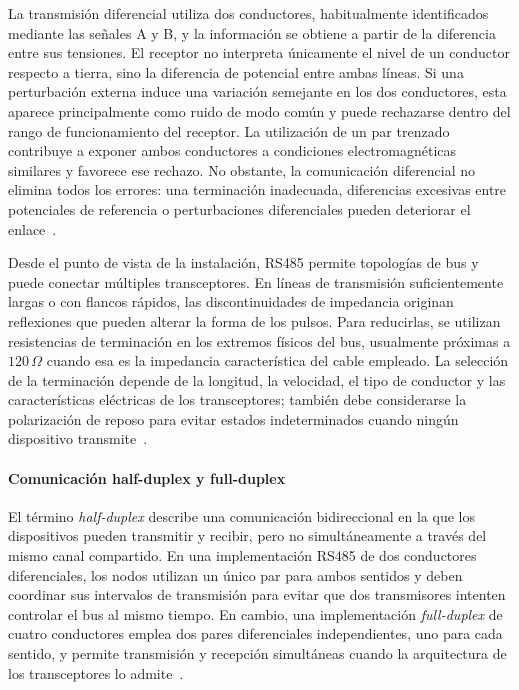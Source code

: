 La transmisión diferencial utiliza dos conductores, habitualmente identificados mediante las señales A y B, y la información se obtiene a partir de la diferencia entre sus tensiones. El receptor no interpreta únicamente el nivel de un conductor respecto a tierra, sino la diferencia de potencial entre ambas líneas. Si una perturbación externa induce una variación semejante en los dos conductores, esta aparece principalmente como ruido de modo común y puede rechazarse dentro del rango de funcionamiento del receptor. La utilización de un par trenzado contribuye a exponer ambos conductores a condiciones electromagnéticas similares y favorece ese rechazo. No obstante, la comunicación diferencial no elimina todos los errores: una terminación inadecuada, diferencias excesivas entre potenciales de referencia o perturbaciones diferenciales pueden deteriorar el enlace~\cite{kugelstadt2021rs485}.

Desde el punto de vista de la instalación, RS485 permite topologías de bus y puede conectar múltiples transceptores. En líneas de transmisión suficientemente largas o con flancos rápidos, las discontinuidades de impedancia originan reflexiones que pueden alterar la forma de los pulsos. Para reducirlas, se utilizan resistencias de terminación en los extremos físicos del bus, usualmente próximas a $120\,\Omega$ cuando esa es la impedancia característica del cable empleado. La selección de la terminación depende de la longitud, la velocidad, el tipo de conductor y las características eléctricas de los transceptores; también debe considerarse la polarización de reposo para evitar estados indeterminados cuando ningún dispositivo transmite~\cite{kugelstadt2021rs485}.

\paragraph{Comunicación half-duplex y full-duplex}
El término \textit{half-duplex} describe una comunicación bidireccional en la que los dispositivos pueden transmitir y recibir, pero no simultáneamente a través del mismo canal compartido. En una implementación RS485 de dos conductores diferenciales, los nodos utilizan un único par para ambos sentidos y deben coordinar sus intervalos de transmisión para evitar que dos transmisores intenten controlar el bus al mismo tiempo. En cambio, una implementación \textit{full-duplex} de cuatro conductores emplea dos pares diferenciales independientes, uno para cada sentido, y permite transmisión y recepción simultáneas cuando la arquitectura de los transceptores lo admite~\cite{kugelstadt2021rs485}.

